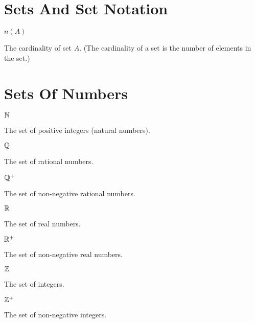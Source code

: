 \section*{Sets And Set Notation}

\begin{vworkmathtermglossaryenum}

\item \mbox{\boldmath $n(A)$}

      The cardinality of set $A$.  (The cardinality of a set is the
      number of elements in the set.)

\end{vworkmathtermglossaryenum}


\section*{Sets Of Numbers}

\begin{vworkmathtermglossaryenum}

\item \mbox{\boldmath ${\mathbb{N}}$}

      The 
      set of positive integers (natural numbers).

\item \mbox{\boldmath ${\mathbb{Q}}$}

      The 
      set of rational numbers.

\item \mbox{\boldmath ${\mathbb{Q}^+}$}

      The 
      set of non-negative rational numbers.

\item \mbox{\boldmath ${\mathbb{R}}$}

      The 
      set of real numbers.

\item \mbox{\boldmath ${\mathbb{R}^+}$}

      The 
      set of non-negative real numbers.

\item \mbox{\boldmath ${\mathbb{Z}}$}

      The 
      set of integers.

\item \mbox{\boldmath ${\mathbb{Z}^+}$}

      The 
      set of non-negative integers.

\end{vworkmathtermglossaryenum}


